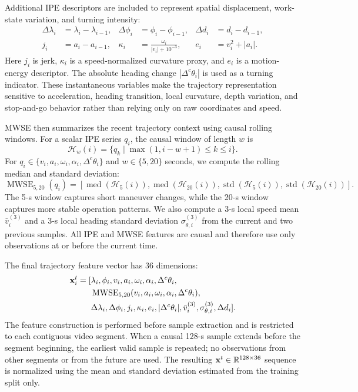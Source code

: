 Additional IPE descriptors are included to represent spatial displacement, work-state variation, and turning intensity:
\begin{align}
    \Delta \lambda_i &= \lambda_i-\lambda_{i-1}, &
    \Delta \phi_i &= \phi_i-\phi_{i-1}, &
    \Delta d_i &= d_i-d_{i-1}, \\
    j_i &= a_i-a_{i-1}, &
    \kappa_i &= \frac{\omega_i}{|v_i| + 10^{-3}}, &
    e_i &= v_i^2 + |a_i|.
\end{align}
Here $j_i$ is jerk, $\kappa_i$ is a speed-normalized curvature proxy, and $e_i$ is a motion-energy descriptor. The absolute heading change $|\Delta^{c}\theta_i|$ is used as a turning indicator. These instantaneous variables make the trajectory representation sensitive to acceleration, heading transition, local curvature, depth variation, and stop-and-go behavior rather than relying only on raw coordinates and speed.

MWSE then summarizes the recent trajectory context using causal rolling windows. For a scalar IPE series $q_i$, the causal window of length $w$ is
\begin{equation}
    \mathcal{H}_w(i)=\{q_k \mid \max(1,i-w+1) \leq k \leq i\}.
\end{equation}
For $q_i \in \{v_i,a_i,\omega_i,\alpha_i,\Delta^{c}\theta_i\}$ and $w \in \{5,20\}$ seconds, we compute the rolling median and standard deviation:
\begin{equation}
    \operatorname{MWSE}_{5,20}(q_i)=
    [\operatorname{med}(\mathcal{H}_5(i)), \operatorname{med}(\mathcal{H}_{20}(i)),
    \operatorname{std}(\mathcal{H}_5(i)), \operatorname{std}(\mathcal{H}_{20}(i))].
\end{equation}
The 5-s window captures short maneuver changes, while the 20-s window captures more stable operation patterns. We also compute a 3-s local speed mean $\bar{v}^{(3)}_i$ and a 3-s local heading standard deviation $\sigma^{(3)}_{\theta,i}$ from the current and two previous samples. All IPE and MWSE features are causal and therefore use only observations at or before the current time.

The final trajectory feature vector has 36 dimensions:
\begin{equation}
\begin{split}
    \mathbf{x}_i^t = [&\lambda_i, \phi_i, v_i, a_i, \omega_i, \alpha_i, \Delta^{c}\theta_i, \\
    &\operatorname{MWSE}_{5,20}(v_i,a_i,\omega_i,\alpha_i,\Delta^{c}\theta_i), \\
    &\Delta \lambda_i, \Delta \phi_i, j_i, \kappa_i, e_i, |\Delta^{c}\theta_i|,
    \bar{v}^{(3)}_i, \sigma^{(3)}_{\theta,i}, \Delta d_i].
\end{split}
\end{equation}
The feature construction is performed before sample extraction and is restricted to each contiguous video segment. When a causal 128-s sample extends before the segment beginning, the earliest valid sample is repeated; no observations from other segments or from the future are used. The resulting $\mathbf{x}^{t}\in\mathbb{R}^{128\times36}$ sequence is normalized using the mean and standard deviation estimated from the training split only.

